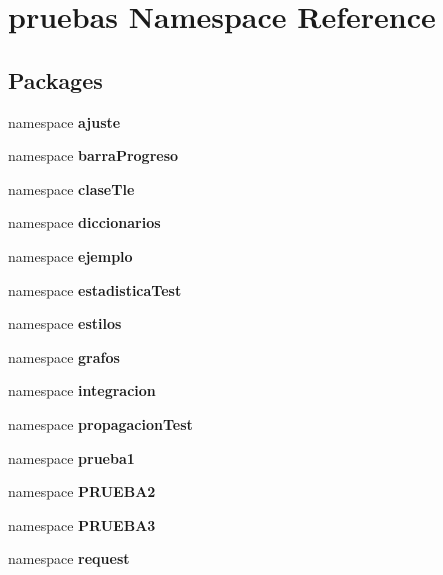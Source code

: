 \section{pruebas \-Namespace \-Reference}
\label{namespacepruebas}
\subsection*{\-Packages}
\begin{DoxyCompactItemize}
\item 
namespace {\bf ajuste}
\item 
namespace {\bf barra\-Progreso}
\item 
namespace {\bf clase\-Tle}
\item 
namespace {\bf diccionarios}
\item 
namespace {\bf ejemplo}
\item 
namespace {\bf estadistica\-Test}
\item 
namespace {\bf estilos}
\item 
namespace {\bf grafos}
\item 
namespace {\bf integracion}
\item 
namespace {\bf propagacion\-Test}
\item 
namespace {\bf prueba1}
\item 
namespace {\bf \-P\-R\-U\-E\-B\-A2}
\item 
namespace {\bf \-P\-R\-U\-E\-B\-A3}
\item 
namespace {\bf request}
\end{DoxyCompactItemize}
